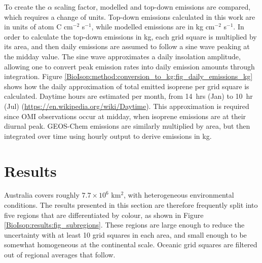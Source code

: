     \label{BioIsop:method:conversion_to_kg}
    To create the $\alpha$ scaling factor, modelled and top-down emissions are compared, which requires a change of units.
    Top-down emissions calculated in this work are in units of atom C cm$^{-2}$ s$^{-1}$, while modelled emissions are in kg cm$^{-2}$ s$^{-1}$.
    In order to calculate the top-down emissions in kg, each grid square is multiplied by its area, and then daily emissions are assumed to follow a sine wave peaking at the midday value.
    The sine wave approximates a daily insolation amplitude, allowing one to convert peak emission rates into daily emission amounts through integration.
    Figure \ref{BioIsop:method:conversion_to_kg:fig_daily_emissions_kg} shows how the daily approximation of total emitted isoprene per grid square is calculated.
    Daytime hours are estimated per month, from 14~hrs (Jan) to 10~hr (Jul) (\url{https://en.wikipedia.org/wiki/Daytime}).
    This approximation is required since OMI observations occur at midday, when isoprene emissions are at their diurnal peak.
    GEOS-Chem emissions are similarly multiplied by area, but then integrated over time using hourly output to derive emissions in kg.
    
    
\section{Results}
  \label{BioIsop:results}
  
  Australia covers roughly $7.7 \times 10^6$ km$^{2}$, with heterogeneous environmental conditions.
  The results presented in this section are therefore frequently split into five regions that are differentiated by colour, as shown in Figure \ref{BioIsop:results:fig_subregions}.
  These regions are large enough to reduce the uncertainty with at least 10 grid squares in each area, and small enough to be somewhat homogeneous at the continental scale.
  Oceanic grid squares are filtered out of regional averages that follow.
  
